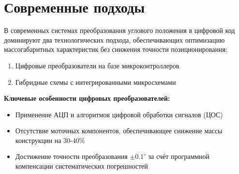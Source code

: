 
    

\section{Современные подходы}

В современных системах преобразования углового положения в цифровой код доминируют два технологических подхода, обеспечивающих оптимизацию массогабаритных характеристик без снижения точности позиционирования:
\begin{enumerate}
    \item Цифровые преобразователи на базе микроконтроллеров
    \item Гибридные схемы с интегрированными микросхемами
\end{enumerate}

\textbf{Ключевые особенности цифровых преобразователей:}
\begin{itemize}
    \item Применение АЦП и алгоритмов цифровой обработки сигналов (ЦОС)
    \item Отсутствие моточных компонентов, обеспечивающее снижение массы конструкции на 30-40\%
    \item Достижение точности преобразования $\pm 0.1^\circ$ за счёт программной компенсации систематических погрешностей
\end{itemize}

